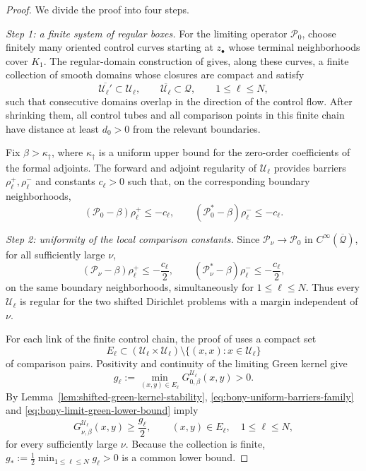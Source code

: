 \documentclass[11pt]{article}
\numberwithin{equation}{section}
\theoremstyle{plain}
\theoremstyle{definition}
\theoremstyle{remark}
\begin{document}
\begin{proof}
We divide the proof into four steps.

\emph{Step 1: a finite system of regular boxes.}
For the limiting operator $\mathscr P_0$, choose finitely many oriented
control curves starting at $z_\bullet$ whose terminal neighborhoods cover
$K_1$.  The regular-domain construction of
\cite[Corollary~5.2 and Theorem~5.2]{Bony1969} gives, along these curves, a
finite collection of smooth domains whose closures are compact and satisfy
\[
\overline{\mathscr U_\ell'}\subset\mathscr U_\ell,
\qquad
\overline{\mathscr U_\ell}\subset\mathcal Q,
\qquad 1\le\ell\le N,
\]
such that consecutive domains overlap in the direction of the control flow.
After shrinking them, all control tubes and all comparison points in this
finite chain
have distance at least $d_0>0$ from the relevant boundaries.

Fix $\beta>\kappa_\dagger$, where $\kappa_\dagger$ is a uniform upper bound
for the zero-order coefficients of the formal adjoints.  The forward and
adjoint regularity of $\mathscr U_\ell$ provides barriers
$\rho_\ell^+,\rho_\ell^-$ and constants $c_\ell>0$ such that, on the
corresponding boundary neighborhoods,
\begin{equation}
\label{eq:bony-uniform-barriers-limit}
(\mathscr P_0-\beta)\rho_\ell^+\le-c_\ell,
\qquad
(\mathscr P_0^*-\beta)\rho_\ell^-\le-c_\ell.
\end{equation}

\emph{Step 2: uniformity of the local comparison constants.}
Since $\mathscr P_\nu\to\mathscr P_0$ in
$C^\infty(\overline{\mathcal Q})$, for all sufficiently large $\nu$,
\begin{equation}
\label{eq:bony-uniform-barriers-family}
(\mathscr P_\nu-\beta)\rho_\ell^+\le-\frac{c_\ell}{2},
\qquad
(\mathscr P_\nu^*-\beta)\rho_\ell^-\le-\frac{c_\ell}{2},
\end{equation}
on the same boundary neighborhoods, simultaneously for
$1\le\ell\le N$.  Thus every $\mathscr U_\ell$ is regular for the two shifted
Dirichlet problems with a margin independent of $\nu$.

For each link of the finite control chain, the proof of
\cite[Theorem~7.1]{Bony1969} uses a compact set
\[
E_\ell\subset
(\mathscr U_\ell\times\mathscr U_\ell)
\setminus\{(x,x):x\in\mathscr U_\ell\}
\]
of comparison pairs.  Positivity and continuity of the limiting Green kernel
give
\begin{equation}
\label{eq:bony-limit-green-lower-bound}
g_\ell:=\min_{(x,y)\in E_\ell}
G_{0,\beta}^{\mathscr U_\ell}(x,y)>0.
\end{equation}
By Lemma~\ref{lem:shifted-green-kernel-stability},
\eqref{eq:bony-uniform-barriers-family} and
\eqref{eq:bony-limit-green-lower-bound} imply
\begin{equation}
\label{eq:bony-family-green-lower-bound}
G_{\nu,\beta}^{\mathscr U_\ell}(x,y)
\ge\frac{g_\ell}{2},
\qquad (x,y)\in E_\ell,\quad 1\le\ell\le N,
\end{equation}
for every sufficiently large $\nu$.  Because the collection is finite,
$g_*:=\frac12\min_{1\le\ell\le N}g_\ell>0$ is a common lower bound.


\end{proof}
\end{document}
